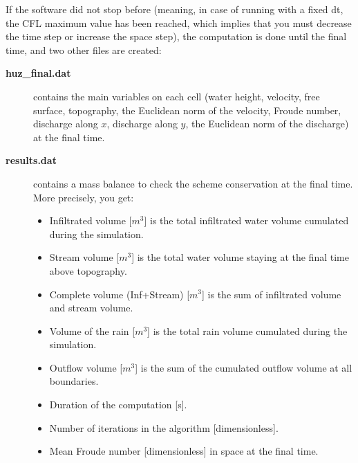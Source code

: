 \documentclass[a4paper, 11pt]{article}
\begin{document}
If the software did not stop before (meaning, in case of running with a fixed dt, the CFL maximum value has been reached, which implies that you must decrease the time step or increase the space step), 
the computation is done until the final time, and two other files are created:
\begin{description}
	\item[\textbf{huz\_final.dat}] contains the main variables on each cell (water height, velocity, free surface, topography, the Euclidean norm of the velocity, Froude number, discharge along $x$, discharge along $y$, the Euclidean norm of the discharge) at the final time.
	\item[\textbf{results.dat}] contains a mass balance to check the scheme conservation at the final time.
	More precisely, you get:
	\begin{itemize}
		\item Infiltrated volume [$m^3$] is the total infiltrated water volume cumulated during the simulation. 
		\item Stream volume [$m^3$] is the total water volume staying at the final time above topography. 
		\item Complete volume (Inf+Stream) [$m^3$] is the sum of infiltrated volume and stream volume.
		\item Volume of the rain [$m^3$] is the total rain volume cumulated during the simulation. 
		\item Outflow volume [$m^3$] is the sum of the cumulated outflow volume at all boundaries. 
		\item Duration of the computation [s]. 
		\item Number of iterations in the algorithm [dimensionless]. 
		\item Mean Froude number [dimensionless] in space at the final time. 
	\end{itemize}
\end{description}
\end{document}
